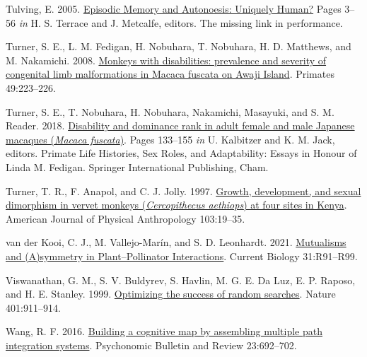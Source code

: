 \documentclass[twoside,12pt,final]{ucthesis-CA2012}
\newenvironment{CSLReferences}%
  {}%
  {\par}
\begin{document}
\begin{ucmainmatter}
\begin{CSLReferences}{1}{0}
\leavevmode{}%
Tulving, E. 2005. \href{http://search.proquest.com.ezp-prod1.hul.harvard.edu/docview/206678868?accountid=11311\%5Cnhttp://sfx.hul.harvard.edu/hvd?url_ver=Z39.88-2004\&rft_val_fmt=info:ofi/fmt:kev:mtx:journal\&genre=article\&sid=ProQ:ProQ:abiglobal\&atitle=The+missing+link+in+performa}{Episodic Memory and Autonoesis: Uniquely Human?} Pages 3--56 \emph{in} H. S. Terrace and J. Metcalfe, editors. The missing link in performance.

\leavevmode{}%
Turner, S. E., L. M. Fedigan, H. Nobuhara, T. Nobuhara, H. D. Matthews, and M. Nakamichi. 2008. \href{https://doi.org/10.1007/s10329-008-0083-4}{Monkeys with disabilities: prevalence and severity of congenital limb malformations in Macaca fuscata on Awaji Island}. Primates 49:223--226.

\leavevmode{}%
Turner, S. E., T. Nobuhara, H. Nobuhara, Nakamichi, Masayuki, and S. M. Reader. 2018. \href{https://doi.org/10.1007/978-3-319-98285-4}{Disability and dominance rank in adult female and male Japanese macaques (\emph{Macaca fuscata})}. Pages 133--155 \emph{in} U. Kalbitzer and K. M. Jack, editors. Primate Life Histories, Sex Roles, and Adaptability: Essays in Honour of Linda M. Fedigan. Springer International Publishing, Cham.

\leavevmode{}%
Turner, T. R., F. Anapol, and C. J. Jolly. 1997. \href{https://doi.org/10.1002/(SICI)1096-8644(199705)103:1\%3C19::AID-AJPA3\%3E3.0.CO;2-8}{Growth, development, and sexual dimorphism in vervet monkeys (\emph{Cercopithecus aethiops}) at four sites in Kenya}. American Journal of Physical Anthropology 103:19--35.

\leavevmode{}%
van der Kooi, C. J., M. Vallejo-Marín, and S. D. Leonhardt. 2021. \href{https://doi.org/10.1016/j.cub.2020.11.020}{Mutualisms and (A)symmetry in Plant--Pollinator Interactions}. Current Biology 31:R91--R99.

\leavevmode{}%
Viswanathan, G. M., S. V. Buldyrev, S. Havlin, M. G. E. Da Luz, E. P. Raposo, and H. E. Stanley. 1999. \href{https://doi.org/10.1038/44831}{Optimizing the success of random searches}. Nature 401:911--914.

\leavevmode{}%
Wang, R. F. 2016. \href{https://doi.org/10.3758/s13423-015-0952-y}{Building a cognitive map by assembling multiple path integration systems}. Psychonomic Bulletin and Review 23:692--702.


\end{CSLReferences}
\end{ucmainmatter}
\end{document}
